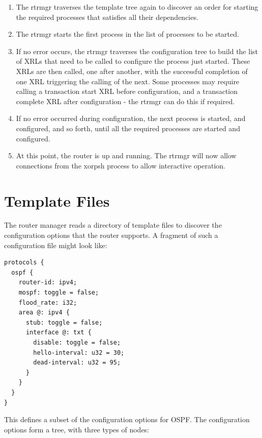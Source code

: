 \documentclass[11pt]{article}
\begin{document}
\begin{enumerate}
  \item The rtrmgr traverses the template tree again to discover an order for
starting the required processes that satisfies all their dependencies.

  \item The rtrmgr starts the first process in the list of processes to be
started.

  \item If no error occurs, the rtrmgr traverses the configuration tree to
build the list of XRLs that need to be called to configure the process
just started.  These XRLs are then called, one after another, with the
successful completion of one XRL triggering the calling of the next.
Some processes may require calling a transaction start XRL before
configuration, and a transaction complete XRL after configuration -
the rtrmgr can do this if required.

  \item If no error occurred during configuration, the next process is started,
and configured, and so forth, until all the required processes are
started and configured.

  \item At this point, the router is up and running.  The rtrmgr will now
allow connections from the xorpsh process to allow interactive
operation.

\end{enumerate}

\newpage

\section{Template Files}

The router manager reads a directory of template files to discover the
configuration options that the router supports.  A fragment of such a
configuration file might look like:

\begin{verbatim}
protocols {
  ospf {
    router-id: ipv4;
    mospf: toggle = false;
    flood_rate: i32;
    area @: ipv4 {
      stub: toggle = false;
      interface @: txt {
        disable: toggle = false;
        hello-interval: u32 = 30;
        dead-interval: u32 = 95;
      }
    }
  }
}
\end{verbatim}

This defines a subset of the configuration options for OSPF.  The
configuration options form a tree, with three types of nodes:
\end{document}
